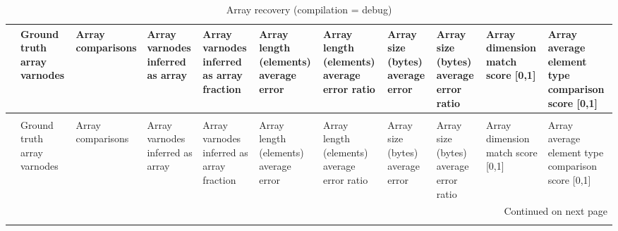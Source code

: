 \begin{longtable}{lp{1.2cm}p{1.2cm}p{1.2cm}p{1.2cm}p{1.2cm}p{1.2cm}p{1.2cm}p{1.2cm}p{1.2cm}p{1.2cm}}
\caption{Array recovery (compilation = debug)}
\label{table:array-comparisons-O0-debug}\\
\toprule
{} &  Ground truth array varnodes &  Array comparisons &  Array varnodes inferred as array &  Array varnodes inferred as array fraction &  Array length (elements) average error &  Array length (elements) average error ratio &  Array size (bytes) average error &  Array size (bytes) average error ratio &  Array dimension match score [0,1] &  Array average element type comparison score [0,1] \\
\midrule
\endfirsthead
\caption[]{Array recovery (compilation = debug)} \\
\toprule
{} &  Ground truth array varnodes &  Array comparisons &  Array varnodes inferred as array &  Array varnodes inferred as array fraction &  Array length (elements) average error &  Array length (elements) average error ratio &  Array size (bytes) average error &  Array size (bytes) average error ratio &  Array dimension match score [0,1] &  Array average element type comparison score [0,1] \\
\midrule
\endhead
\midrule
\multicolumn{11}{r}{{Continued on next page}} \\
\midrule
\endfoot


\end{longtable}
